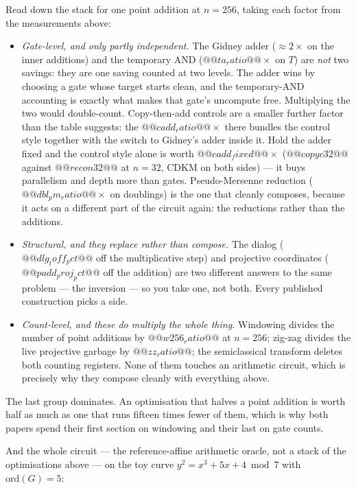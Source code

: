 \begin{keybox}[title={How the savings compose --- and where they do not}]
Read down the stack for one point addition at $n=256$, taking each factor from the measurements
above:
\begin{itemize}\setlength\itemsep{2pt}
\item \emph{Gate-level, and only partly independent.} The Gidney adder ($\approx2\times$ on the
inner additions) and the temporary AND ($@@ta_ratio@@\times$ on $T$) are \emph{not} two savings:
they are one saving counted at two levels. The adder wins by choosing a gate whose target starts
clean, and the temporary-AND accounting is exactly what makes that gate's uncompute free.
Multiplying the two would double-count. Copy-then-add controls are a smaller further factor than
the table suggests: the $@@cadd_ratio@@\times$ there bundles the control style together with the
switch to Gidney's adder inside it. Hold the adder fixed and the control style alone is worth
$@@cadd_fixed@@\times$ ($@@copyc32@@$ against $@@recon32@@$ at $n=32$, CDKM on both sides) --- it
buys parallelism and depth more than gates. Pseudo-Mersenne reduction
($@@dbl_pm_ratio@@\times$ on doublings) is the one that cleanly composes, because it acts on a
different part of the circuit again: the reductions rather than the additions.
\item \emph{Structural, and they replace rather than compose.} The dialog
($@@dlg_toff_pct@@$ off the multiplicative step) and projective coordinates
($@@padd_proj_pct@@$ off the addition) are two different answers to the same problem --- the
inversion --- so you take one, not both. Every published construction picks a side.
\item \emph{Count-level, and these do multiply the whole thing.} Windowing divides the number of
point additions by $@@w256_ratio@@$ at $n=256$; zig-zag divides the live projective garbage by
$@@zz_ratio@@$; the semiclassical transform deletes both counting registers. None of them touches an
arithmetic circuit, which is precisely why they compose cleanly with everything above.
\end{itemize}
The last group dominates. An optimisation that halves a point addition is worth half as much as one
that runs fifteen times fewer of them, which is why both papers spend their first section on
windowing and their last on gate counts.
\end{keybox}

\noindent
And the whole circuit --- the reference-affine arithmetic oracle, not a stack of the optimisations
above --- on the toy curve $y^2=x^3+5x+4 \bmod 7$ with $\mathrm{ord}(G)=5$:

